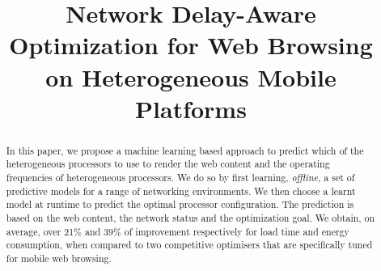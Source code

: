 \documentclass[conference,compsoc]{IEEEtran}
\begin{document}
%
\title{Network Delay-Aware Optimization for Web Browsing \\on Heterogeneous Mobile Platforms\vspace{-4 mm}}

 
\author{  }

\maketitle

\begin{abstract}
In this paper, we propose a machine
learning based approach to predict which of the heterogeneous processors to use to render the web content and the operating frequencies of heterogeneous processors.
We do so by first learning, \emph{offline}, a set of predictive models for a range of networking
environments. We then choose a learnt model at runtime to predict the optimal processor configuration. The prediction is based on the web content, the network status and the optimization goal.
We obtain, on average, over 21\% and 39\%
of improvement respectively for load time and energy consumption, when compared to two competitive
optimisers that are specifically tuned for mobile web browsing.
\end{abstract}





%
\IEEEpeerreviewmaketitle













\end{document}

